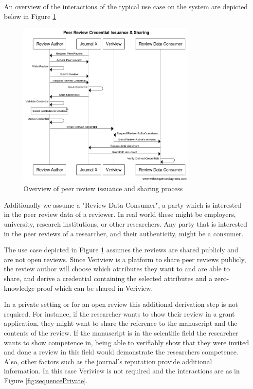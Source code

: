 An overview of the interactions of the typical use case on the system are depicted below in Figure \ref{fig:sequence1} 

\begin{figure}[htpb]
  \centering
  \includegraphics[width=0.8\textwidth]{figures/sequence.png}
  \caption{Overview of peer review issuance and sharing process} \label{fig:sequence1}
\end{figure}

Additionally we assume a "Review Data Consumer", a party which is interested in the peer review data of a reviewer. In real world these might be employers, university, research institutions, or other researchers. Any party that is interested in the peer reviews of a researcher, and their authenticity, might be a consumer. 

The use case depicted in Figure \ref{fig:sequence1} assumes the reviews are shared publicly and are not open reviews. Since Veriview is a platform to share peer reviews publicly, the review author will choose which attributes they want to and are able to share, and derive a credential containing the selected attributes and a zero-knowledge proof which can be shared in Veriview. 

In a private setting or for an open review this additional derivation step is not required. For instance, if the researcher wants to show their review in a grant application, they might want to share the reference to the manuscript and the contents of the review. If the manuscript is in the scientific field the researcher wants to show competence in, being able to verifiably show that they were invited and done a review in this field  would demonstrate the researchers competence. Also, other factors such as the journal's reputation provide additional information. In this case Veriview is not required and the interactions are as in Figure \ref{fig:sequencePrivate}.

